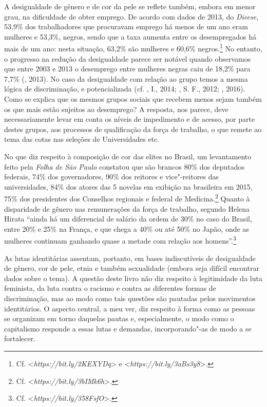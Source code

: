 A desigualdade de gênero e de cor da pele se reflete também, embora em
menor grau, na dificuldade de obter emprego. De acordo com dados de
2013, do \emph{Dieese}, 53,9\% dos trabalhadores que procuravam emprego
há menos de um ano eram mulheres e 53,3\%, negros, sendo que a taxa
aumenta entre os desempregados há mais de um ano: nesta situação, 63,2\%
são mulheres e 60,6\% negros.\footnote{Cf.
  \textless{}\emph{https://bit.ly/2KEXYDq}\textgreater{}
  e
  \textless{}\emph{https://bit.ly/3aBs3y8}\textgreater{}.}
No entanto, o progresso na redução da desigualdade parece ser notável
quando observamos que entre 2003 e 2013 o desemprego entre mulheres
negras caiu de 18,2\% para 7,7\% (, 2013). No caso da desigualdade
com relação ao grupo  temos a mesma lógica de discriminação, e
potencializada (cf. , I., 2014; , S. F., 2012; , 2016). Como se explica que os mesmos grupos sociais que
recebem menos sejam também os que mais estão sujeitos ao desemprego? A
resposta, nos parece, deve necessariamente levar em conta os níveis de
impedimento e de acesso, por parte destes grupos, aos processos de
qualificação da força de trabalho, o que remete ao tema das cotas nas
seleções de Universidades etc.

No que diz respeito à composição de cor das elites no Brasil, um
levantamento feito pela \emph{Folha de São Paulo} constatou que são
brancos 80\% dos deputados federais, 74\% dos governadores, 90\% dos
reitores e vice"-reitores das universidades, 84\% dos atores das 5
novelas em exibição na  brasileira em 2015, 75\% dos presidentes dos
Conselhos regionais e federal de Medicina.\footnote{Cf.
  \textless{}\emph{https://bit.ly/3bIMk6h}\textgreater{}.}
Quanto à disparidade de gênero nas remunerações da força de trabalho,
segundo Helena Hirata ``ainda há um diferencial de salário da ordem de
30\% no caso do Brasil, entre 20\% e 25\% na França, e que chega a 40\%
ou até 50\% no Japão, onde as mulheres continuam ganhando quase a metade
com relação aos homens''.\footnote{Cf.
  \textless{}\emph{https://bit.ly/358FsfO}\textgreater{}.}

As lutas identitárias assentam, portanto, em bases indiscutíveis de
desigualdade de gênero, cor de pele, etnia e também sexualidade (embora
seja difícil encontrar dados sobre o tema). A questão deste livro não
diz respeito à legitimidade da luta feminista, da luta contra o racismo
e contra as diferentes formas de discriminação, mas ao modo como tais
questões são pautadas pelos movimentos identitários. O aspecto central,
a meu ver, diz respeito à forma como as pessoas se organizam em torno
daquelas pautas e, especialmente, o modo como o capitalismo responde a
essas lutas e demandas, incorporando"-as de modo a se fortalecer.

